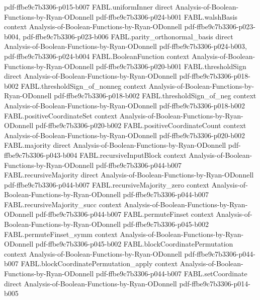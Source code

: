 \begin{theorem}
  {pdf-ffbe9c7b3306-p015-b007}
\proofstep
  {FABL.uniformInner}
  {direct}
  {Analysis-of-Boolean-Functions-by-Ryan-ODonnell}
  {pdf-ffbe9c7b3306-p024-b001}
\proofstep
  {FABL.walshBasis}
  {context}
  {Analysis-of-Boolean-Functions-by-Ryan-ODonnell}
  {pdf-ffbe9c7b3306-p023-b004,
    pdf-ffbe9c7b3306-p023-b006}
\proofstep
  {FABL.parity_orthonormal_basis}
  {direct}
  {Analysis-of-Boolean-Functions-by-Ryan-ODonnell}
  {pdf-ffbe9c7b3306-p024-b003,
    pdf-ffbe9c7b3306-p024-b004}
\proofstep
  {FABL.BooleanFunction}
  {context}
  {Analysis-of-Boolean-Functions-by-Ryan-ODonnell}
  {pdf-ffbe9c7b3306-p020-b001}
\proofstep
  {FABL.thresholdSign}
  {direct}
  {Analysis-of-Boolean-Functions-by-Ryan-ODonnell}
  {pdf-ffbe9c7b3306-p018-b002}
\proofstep
  {FABL.thresholdSign_of_nonneg}
  {context}
  {Analysis-of-Boolean-Functions-by-Ryan-ODonnell}
  {pdf-ffbe9c7b3306-p018-b002}
\proofstep
  {FABL.thresholdSign_of_neg}
  {context}
  {Analysis-of-Boolean-Functions-by-Ryan-ODonnell}
  {pdf-ffbe9c7b3306-p018-b002}
\proofstep
  {FABL.positiveCoordinateSet}
  {context}
  {Analysis-of-Boolean-Functions-by-Ryan-ODonnell}
  {pdf-ffbe9c7b3306-p020-b002}
\proofstep
  {FABL.positiveCoordinateCount}
  {context}
  {Analysis-of-Boolean-Functions-by-Ryan-ODonnell}
  {pdf-ffbe9c7b3306-p020-b002}
\proofstep
  {FABL.majority}
  {direct}
  {Analysis-of-Boolean-Functions-by-Ryan-ODonnell}
  {pdf-ffbe9c7b3306-p043-b004}
\proofstep
  {FABL.recursiveInputBlock}
  {context}
  {Analysis-of-Boolean-Functions-by-Ryan-ODonnell}
  {pdf-ffbe9c7b3306-p044-b007}
\proofstep
  {FABL.recursiveMajority}
  {direct}
  {Analysis-of-Boolean-Functions-by-Ryan-ODonnell}
  {pdf-ffbe9c7b3306-p044-b007}
\proofstep
  {FABL.recursiveMajority_zero}
  {context}
  {Analysis-of-Boolean-Functions-by-Ryan-ODonnell}
  {pdf-ffbe9c7b3306-p044-b007}
\proofstep
  {FABL.recursiveMajority_succ}
  {context}
  {Analysis-of-Boolean-Functions-by-Ryan-ODonnell}
  {pdf-ffbe9c7b3306-p044-b007}
\proofstep
  {FABL.permuteFinset}
  {context}
  {Analysis-of-Boolean-Functions-by-Ryan-ODonnell}
  {pdf-ffbe9c7b3306-p045-b002}
\proofstep
  {FABL.permuteFinset_symm}
  {context}
  {Analysis-of-Boolean-Functions-by-Ryan-ODonnell}
  {pdf-ffbe9c7b3306-p045-b002}
\proofstep
  {FABL.blockCoordinatePermutation}
  {context}
  {Analysis-of-Boolean-Functions-by-Ryan-ODonnell}
  {pdf-ffbe9c7b3306-p044-b007}
\proofstep
  {FABL.blockCoordinatePermutation_apply}
  {context}
  {Analysis-of-Boolean-Functions-by-Ryan-ODonnell}
  {pdf-ffbe9c7b3306-p044-b007}
\proofstep
  {FABL.setCoordinate}
  {direct}
  {Analysis-of-Boolean-Functions-by-Ryan-ODonnell}
  {pdf-ffbe9c7b3306-p014-b005}

\end{theorem}
